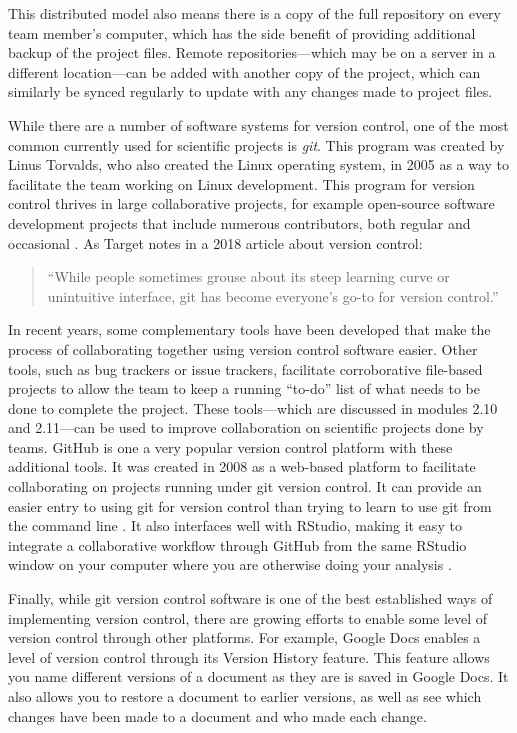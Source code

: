 \documentclass[]{tufte-book}
\begin{document}
This distributed model also means there is a copy of the full repository on
every team member's computer, which has the side benefit of providing additional
backup of the project files. Remote repositories---which may be on a server in a
different location---can be added with another copy of the project, which can
similarly be synced regularly to update with any changes made to project files.

While there are a number of software systems for version control, one of the
most common currently used for scientific projects is \emph{git}. This program was
created by Linus Torvalds, who also created the Linux operating system, in 2005
as a way to facilitate the team working on Linux development. This program for
version control thrives in large collaborative projects, for example open-source
software development projects that include numerous contributors, both regular
and occasional \citep{brown2018git}. As Target notes in a 2018 article about
version control:

\begin{quote}
``While people sometimes grouse about its steep learning curve or unintuitive
interface, git has become everyone's go-to for version control.''
\citep{target2018version}
\end{quote}

In recent years, some complementary tools have been developed that make the
process of collaborating together using version control software easier. Other
tools, such as bug trackers or issue trackers, facilitate corroborative
file-based projects to allow the team to keep a running ``to-do'' list of what
needs to be done to complete the project. These tools---which are discussed in
modules 2.10 and 2.11---can be used to improve collaboration on scientific
projects done by teams. GitHub is one a very popular version control platform
with these additional tools. It was created in 2008 as a web-based platform to
facilitate collaborating on projects running under git version control. It can
provide an easier entry to using git for version control than trying to learn to
use git from the command line \citep{perez2016ten}. It also interfaces well with RStudio,
making it easy to integrate a collaborative workflow through GitHub from the
same RStudio window on your computer where you are otherwise doing your analysis
\citep{perez2016ten}.

Finally, while git version control software is one of the best established ways
of implementing version control, there are growing efforts to enable some level
of version control through other platforms. For example, Google Docs enables a
level of version control through its Version History feature. This feature
allows you name different versions of a document as they are is saved in Google
Docs. It also allows you to restore a document to earlier versions, as well as
see which changes have been made to a document and who made each change.
\end{document}
